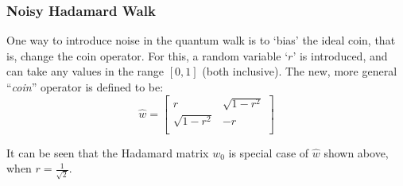 \documentclass[english]{article}
\begin{document}
\subsubsection{Noisy Hadamard Walk} \label{sec: noisy hadamard walk}

One way to introduce noise in the quantum walk is to `bias' the ideal coin, that is, change the coin operator. For this, a random variable `$r$' is introduced, and can take any values in the range $[0,1]$ (both inclusive). The new, more general ``\textit{coin}'' operator is defined to be:
\begin{equation}
\hat{w} = \left[ \begin{array}{cc}
r                 &  \sqrt{1 - r^{2}} \\
\sqrt{1 - r^{2}}  &   -r \\
\end{array} \right]
\end{equation}


It can be seen that the Hadamard matrix $\hat{w_{0}}$ is special case of $\hat{w}$ shown above, when $r = \frac{1}{\sqrt{2}}$. \newline


\end{document}
